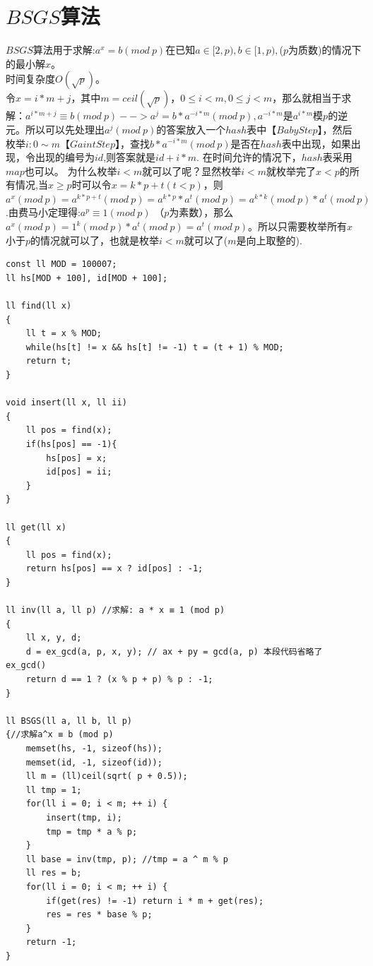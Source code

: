 \section{$BSGS$算法}
$BSGS$算法用于求解:$a^x = b (mod\  p)$在已知$a\in [2, p),b\in [1, p),$($p$为质数)的情况下的最小解$x$。\\
时间复杂度$O(\sqrt {p})$。 \\
令$x = i * m + j$，其中$m = ceil(\sqrt{p})，0 \leq i < m,0 \leq j < m$，那么就相当于求解：$a^{i * m + j} \equiv b(mod\  p)--> a^j = b * a ^{- i * m} (mod\  p),a^{-i * m}$是$a^{i * m}$模$p$的逆元。所以可以先处理出$a^j (mod\ p)$的答案放入一个$hash$表中【$Baby Step$】，然后枚举$i:0 \sim m$【$Gaint Step$】，查找$b * a ^{- i * m} (mod\  p)$是否在$hash$表中出现，如果出现，令出现的编号为$id$,则答案就是$id + i * m$. 在时间允许的情况下，$hash$表采用$map$也可以。
为什么枚举$i<m$就可以了呢？显然枚举$i < m$就枚举完了$x < p$的所有情况,当$x \geq p$时可以令$x = k * p + t(t < p)$，则$a^x (mod\  p)= a^{k * p + t}(mod\  p) = a^{k * p} * a^t (mod\  p) = a^{k * k}  (mod\  p) * a^t (mod\ p)$.由费马小定理得:$a^p \equiv 1(mod\  p)$ （$p$为素数），那么$a^x (mod\  p) = 1^k (mod\  p) * a^t (mod\  p) = a^t (mod\ p)$。所以只需要枚举所有$x$小于$p$的情况就可以了，也就是枚举$i < m$就可以了($m$是向上取整的).
\begin{lstlisting}
const ll MOD = 100007;
ll hs[MOD + 100], id[MOD + 100];

ll find(ll x)
{
    ll t = x % MOD;
    while(hs[t] != x && hs[t] != -1) t = (t + 1) % MOD;
    return t;
}

void insert(ll x, ll ii)
{
    ll pos = find(x);
    if(hs[pos] == -1){
        hs[pos] = x;
        id[pos] = ii;
    }
}

ll get(ll x)
{
    ll pos = find(x);
    return hs[pos] == x ? id[pos] : -1;
}

ll inv(ll a, ll p) //求解: a * x ≡ 1 (mod p)
{
    ll x, y, d;
    d = ex_gcd(a, p, x, y); // ax + py = gcd(a, p) 本段代码省略了ex_gcd()
    return d == 1 ? (x % p + p) % p : -1;
}

ll BSGS(ll a, ll b, ll p)
{//求解a^x ≡ b (mod p)
    memset(hs, -1, sizeof(hs));
    memset(id, -1, sizeof(id));
    ll m = (ll)ceil(sqrt( p + 0.5));
    ll tmp = 1;
    for(ll i = 0; i < m; ++ i) {
        insert(tmp, i);
        tmp = tmp * a % p;
    }
    ll base = inv(tmp, p); //tmp = a ^ m % p
    ll res = b;
    for(ll i = 0; i < m; ++ i) {
        if(get(res) != -1) return i * m + get(res);
        res = res * base % p;
    }
    return -1;
}
\end{lstlisting}

